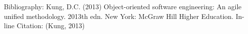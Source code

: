 Bibliography: 
Kung, D.C. (2013) Object-oriented software engineering: An agile unified methodology. 2013th edn. New York: McGraw Hill Higher Education. 
In-line Citation: 
(Kung, 2013) 